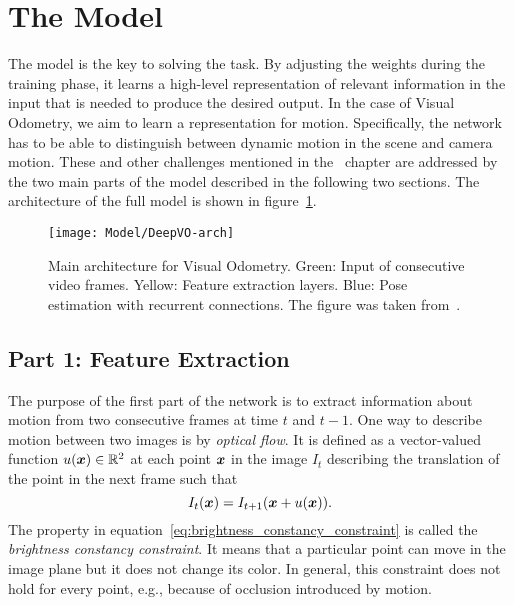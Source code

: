 	\section{The Model}
		The model is the key to solving the task.
		By adjusting the weights during the training phase, it learns a high-level representation of relevant information in the input that is needed to produce the desired output.
		In the case of Visual Odometry, we aim to learn a representation for motion.
		Specifically, the network has to be able to distinguish between dynamic motion in the scene and camera motion.
		These and other challenges mentioned in the~ chapter are addressed by the two main parts of the model described in the following two sections.
		The architecture of the full model is shown in figure~\ref{fig:main-architecture}.
		\begin{figure}[t]
			\centering
			\texttt{[image: Model/DeepVO-arch]}
			\caption[Main architecture for Visual Odometry]
					{Main architecture for Visual Odometry.
					 Green: Input of consecutive video frames.
					 Yellow: Feature extraction layers.
					 Blue: Pose estimation with recurrent connections.
					 The figure was taken from~\cite{wang2017deepvo}.
					 \label{fig:main-architecture}}
		\end{figure}
		
		\subsection{Part 1: Feature Extraction}
			The purpose of the first part of the network is to extract information about motion from two consecutive frames at time $t$ and $t - 1$.
			One way to describe motion between two images is by \emph{optical flow}.
			It is defined as a vector-valued function $u(\bm{x}) \in \mathbb{R}^2$ at each point $\bm{x}$ in the image $I_{t}$ describing the translation of the point in the next frame such that
			\begin{equation}\label{eq:brightness_constancy_constraint}
				I_{t}(\bm{x}) = I_{t + 1}(\bm{x} + u(\bm{x})).
			\end{equation}
			The property in equation~\ref{eq:brightness_constancy_constraint} is called the \emph{brightness constancy constraint}. 
			It means that a particular point can move in the image plane but it does not change its color.
			In general, this constraint does not hold for every point, e.g., because of occlusion introduced by motion.
			
